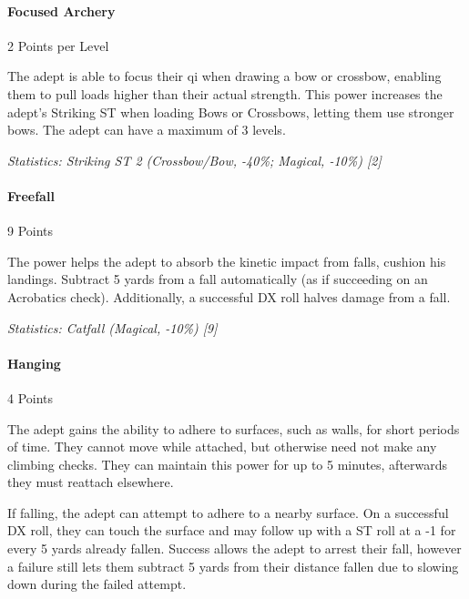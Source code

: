 \begin{multicols}{3}
	\paragraph{Focused Archery}
	\begin{flushright}
		2 Points per Level
	\end{flushright}

	The adept is able to focus their qi when drawing a bow or crossbow, enabling them to pull loads higher than their actual strength. This power increases the adept's Striking ST when loading Bows or Crossbows, letting them use stronger bows. The adept can have a maximum of 3 levels.

	\textcolor{OliveGreen}{\textit{Statistics: Striking ST 2 (Crossbow/Bow, -40\%; Magical, -10\%) [2] }}

	\paragraph{Freefall}
	\begin{flushright}
		9 Points
	\end{flushright}

	The power helps the adept to absorb the kinetic impact from falls, cushion his landings. Subtract 5 yards from a fall automatically (as if succeeding on an Acrobatics check). Additionally, a successful DX roll halves damage from a fall.

	\textcolor{OliveGreen}{\textit{Statistics: Catfall (Magical, -10\%) [9]}}

	\paragraph{Hanging}
	\begin{flushright}
		4 Points
	\end{flushright}

	The adept gains the ability to adhere to surfaces, such as walls, for short periods of time. They cannot move while attached, but otherwise need not make any climbing checks. They can maintain this power for up to 5 minutes, afterwards they must reattach elsewhere.
	
	If falling, the adept can attempt to adhere to a nearby surface. On a successful DX roll, they can touch the surface and may follow up with a ST roll at a -1 for every 5 yards already fallen. Success allows the adept to arrest their fall, however a failure still lets them subtract 5 yards from their distance fallen due to slowing down during the failed attempt.
	

\end{multicols}
